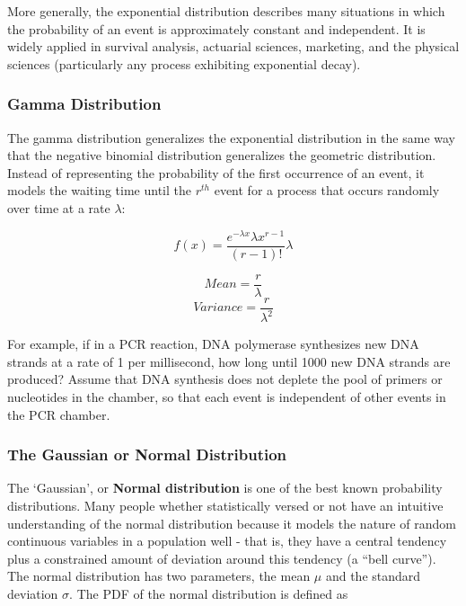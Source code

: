 \documentclass[]{book}
\begin{document}
More generally, the exponential distribution describes many situations in which the probability of an event is approximately constant and independent. It is widely applied in survival analysis, actuarial sciences, marketing, and the physical sciences (particularly any process exhibiting exponential decay).

\hypertarget{gamma-distribution}{%
\subsubsection{\texorpdfstring{\textbf{Gamma Distribution}}{Gamma Distribution}}\label{gamma-distribution}}

The gamma distribution generalizes the exponential distribution in the same way that the negative binomial distribution generalizes the geometric distribution. Instead of representing the probability of the first occurrence of an event, it models the waiting time until the \(r^{th}\) event for a process that occurs randomly over time at a rate \(\lambda\):

\[f(x) = \frac{e^{-\lambda x}\lambda x^{r-1}}{(r-1)!}\lambda\]

\[ Mean =  \frac{r}{\lambda} \]
\[ Variance = \frac{r}{\lambda^2} \]

For example, if in a PCR reaction, DNA polymerase synthesizes new DNA strands at a rate of 1 per millisecond, how long until 1000 new DNA strands are produced? Assume that DNA synthesis does not deplete the pool of primers or nucleotides in the chamber, so that each event is independent of other events in the PCR chamber.

\hypertarget{the-gaussian-or-normal-distribution}{%
\subsubsection{The Gaussian or Normal Distribution}\label{the-gaussian-or-normal-distribution}}

The `Gaussian', or \textbf{Normal distribution} is one of the best known probability distributions. Many people whether statistically versed or not have an intuitive understanding of the normal distribution because it models the nature of random continuous variables in a population well - that is, they have a central tendency plus a constrained amount of deviation around this tendency (a ``bell curve''). The normal distribution has two parameters, the mean \(\mu\) and the standard deviation \(\sigma\). The PDF of the normal distribution is defined as
\end{document}
